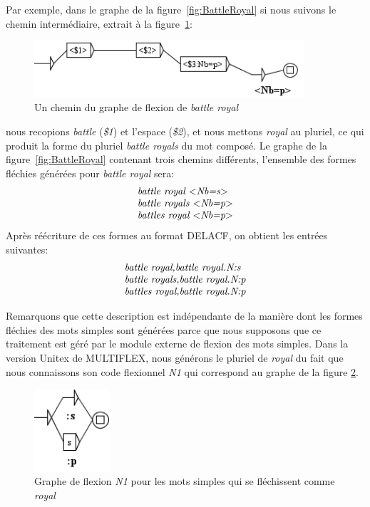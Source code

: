 \bigskip
\noindent Par exemple, dans le graphe de la figure~\ref{fig:BattleRoyal} si nous suivons le chemin
intermédiaire, extrait à la figure~\ref{fig:BattleRoyalonepath}:

\begin{figure}[!htb]
  \centering
  \includegraphics[width=10cm]{resources/img/BattleRoyalonepath.png}
  \caption{Un chemin du graphe de flexion de \emph{battle royal}}
  \label{fig:BattleRoyalonepath}
\end{figure}

\bigskip
\noindent nous recopions \emph{battle} (\emph{\$1}) et l'espace (\emph{\$2}), et nous mettons
\emph{royal} au pluriel, ce qui produit la forme du pluriel \emph{battle royals} du mot composé. Le
graphe de la figure~\ref{fig:BattleRoyal} contenant trois chemins différents, l'ensemble des formes
fléchies générées pour \emph{battle royal} sera: 
\[
\begin{array}[l]{l}
\emph{battle royal $<$Nb=s$>$} \\
\emph{battle royals $<$Nb=p$>$} \\
\emph{battles royal $<$Nb=p$>$}
\end{array}
\]
\bigskip
\noindent Après réécriture de ces formes au format DELACF, on obtient les entrées suivantes:
\[
\begin{array}[l]{l}
\emph{battle royal,battle royal.N:s} \\
\emph{battle royals,battle royal.N:p} \\
\emph{battles royal,battle royal.N:p}
\end{array}
\]

\bigskip
\noindent Remarquons que cette description est indépendante de la manière dont les formes fléchies
des mots simples sont générées parce que nous supposons que ce traitement est géré par le module
externe de flexion des mots simples. Dans la version Unitex de MULTIFLEX, nous générons le pluriel
de \emph{royal} du fait que nous connaissons son code flexionnel \emph{N1} qui correspond au graphe
de la figure \ref{fig:N1}.

\begin{figure}[!htb]
  \centering
  \includegraphics[width=2.8cm]{resources/img/N1'EN.png}
  \caption{Graphe de flexion \emph{N1} pour les mots simples qui se fléchissent comme \emph{royal}}
  \label{fig:N1}
\end{figure}

